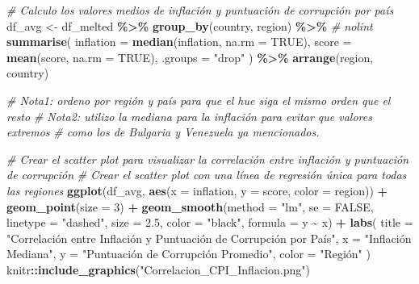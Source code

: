 \documentclass[
]{article}
\newenvironment{Shaded}{\begin{snugshade}}{\end{snugshade}}
\newcommand{\AttributeTok}[1]{\textcolor[rgb]{0.13,0.29,0.53}{#1}}
\newcommand{\CommentTok}[1]{\textcolor[rgb]{0.56,0.35,0.01}{\textit{#1}}}
\newcommand{\ConstantTok}[1]{\textcolor[rgb]{0.56,0.35,0.01}{#1}}
\newcommand{\DecValTok}[1]{\textcolor[rgb]{0.00,0.00,0.81}{#1}}
\newcommand{\FloatTok}[1]{\textcolor[rgb]{0.00,0.00,0.81}{#1}}
\newcommand{\FunctionTok}[1]{\textcolor[rgb]{0.13,0.29,0.53}{\textbf{#1}}}
\newcommand{\NormalTok}[1]{#1}
\newcommand{\OtherTok}[1]{\textcolor[rgb]{0.56,0.35,0.01}{#1}}
\newcommand{\SpecialCharTok}[1]{\textcolor[rgb]{0.81,0.36,0.00}{\textbf{#1}}}
\newcommand{\StringTok}[1]{\textcolor[rgb]{0.31,0.60,0.02}{#1}}
\begin{document}
\begin{Shaded}
\begin{Highlighting}[]

\CommentTok{\# Calculo los valores medios de inflación y puntuación de corrupción por país}
\NormalTok{df\_avg }\OtherTok{\textless{}{-}}\NormalTok{ df\_melted }\SpecialCharTok{\%\textgreater{}\%}
    \FunctionTok{group\_by}\NormalTok{(country, region) }\SpecialCharTok{\%\textgreater{}\%} \CommentTok{\# nolint}
    \FunctionTok{summarise}\NormalTok{(}
        \AttributeTok{inflation =} \FunctionTok{median}\NormalTok{(inflation, }\AttributeTok{na.rm =} \ConstantTok{TRUE}\NormalTok{),}
        \AttributeTok{score =} \FunctionTok{mean}\NormalTok{(score, }\AttributeTok{na.rm =} \ConstantTok{TRUE}\NormalTok{), }\AttributeTok{.groups =} \StringTok{"drop"}
\NormalTok{    ) }\SpecialCharTok{\%\textgreater{}\%}
    \FunctionTok{arrange}\NormalTok{(region, country)}
    
\CommentTok{\# Nota1: ordeno por región y país para que el hue siga el mismo orden que el resto}
\CommentTok{\# Nota2: utilizo la mediana para la inflación para evitar que valores extremos }
\CommentTok{\# como los de Bulgaria y Venezuela ya mencionados.}

\CommentTok{\# Crear el scatter plot para visualizar la correlación entre inflación y puntuación de corrupción}
\CommentTok{\# Crear el scatter plot con una línea de regresión única para todas las regiones}
\FunctionTok{ggplot}\NormalTok{(df\_avg, }\FunctionTok{aes}\NormalTok{(}\AttributeTok{x =}\NormalTok{ inflation, }\AttributeTok{y =}\NormalTok{ score, }\AttributeTok{color =}\NormalTok{ region)) }\SpecialCharTok{+}
    \FunctionTok{geom\_point}\NormalTok{(}\AttributeTok{size =} \DecValTok{3}\NormalTok{) }\SpecialCharTok{+}
    \FunctionTok{geom\_smooth}\NormalTok{(}\AttributeTok{method =} \StringTok{"lm"}\NormalTok{, }\AttributeTok{se =} \ConstantTok{FALSE}\NormalTok{, }\AttributeTok{linetype =} \StringTok{"dashed"}\NormalTok{, }\AttributeTok{size =} \FloatTok{2.5}\NormalTok{, }\AttributeTok{color =} \StringTok{"black"}\NormalTok{, }\AttributeTok{formula =}\NormalTok{ y }\SpecialCharTok{\textasciitilde{}}\NormalTok{ x) }\SpecialCharTok{+}
    \FunctionTok{labs}\NormalTok{(}
        \AttributeTok{title =} \StringTok{"Correlación entre Inflación y Puntuación de Corrupción por País"}\NormalTok{,}
        \AttributeTok{x =} \StringTok{"Inflación Mediana"}\NormalTok{,}
        \AttributeTok{y =} \StringTok{"Puntuación de Corrupción Promedio"}\NormalTok{,}
        \AttributeTok{color =} \StringTok{"Región"}
\NormalTok{    )}
\NormalTok{knitr}\SpecialCharTok{::}\FunctionTok{include\_graphics}\NormalTok{(}\StringTok{"Correlacion\_CPI\_Inflacion.png"}\NormalTok{)}
   
\end{Highlighting}
\end{Shaded}
\end{document}
